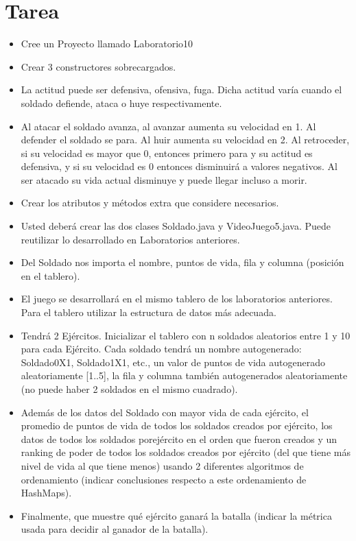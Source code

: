 \documentclass{article}
\begin{document}
	\section{Tarea}
	\begin{itemize}		
        \item Cree un Proyecto llamado Laboratorio10
        \item Crear 3 constructores sobrecargados.
        \item La actitud puede ser defensiva, ofensiva, fuga. Dicha actitud varía cuando el soldado defiende, ataca o huye respectivamente.
        \item Al atacar el soldado avanza, al avanzar aumenta su velocidad en 1. Al defender el soldado se para. Al huir aumenta su velocidad en 2. Al retroceder, si su velocidad es mayor que 0, entonces primero para y su actitud es defensiva, y si su velocidad es 0 entonces disminuirá a valores negativos. Al ser atacado su vida actual disminuye y puede llegar incluso a morir.
        \item Crear los atributos y métodos extra que considere necesarios.
		\item Usted deberá crear las dos clases Soldado.java y VideoJuego5.java. Puede reutilizar lo desarrollado en Laboratorios anteriores.
		\item Del Soldado nos importa el nombre, puntos de vida, fila y columna (posición en el tablero).
		\item El juego se desarrollará en el mismo tablero de los laboratorios anteriores. Para el tablero utilizar la estructura de datos más adecuada.
		\item Tendrá 2 Ejércitos. Inicializar el tablero con n soldados aleatorios entre 1 y 10 para cada Ejército. Cada soldado tendrá un nombre autogenerado: Soldado0X1, Soldado1X1, etc., un valor de puntos de vida autogenerado aleatoriamente [1..5], la fila y columna también autogenerados aleatoriamente (no puede haber 2 soldados en el mismo cuadrado). 
		\item Además de los datos del Soldado con mayor vida de cada ejército, el promedio de puntos de vida de todos los soldados creados por ejército, los datos de todos los soldados porejército en el orden que fueron creados y un ranking de poder de todos los soldados creados por ejército (del que tiene más nivel de vida al que tiene menos) usando 2 diferentes algoritmos de ordenamiento (indicar conclusiones respecto a este ordenamiento de HashMaps).
		\item Finalmente, que muestre qué ejército ganará la batalla (indicar la métrica usada para decidir al ganador de la batalla).

\end{itemize}
\end{document}
